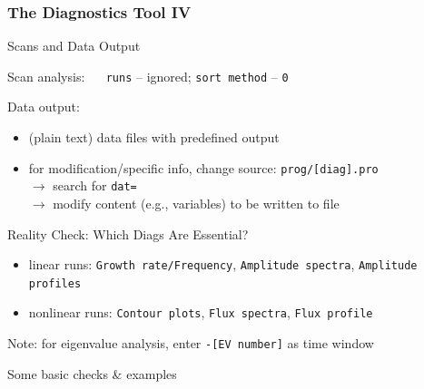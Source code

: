 \documentclass[10pt]{beamer}
\begin{document}

\begin{frame}[fragile]
  \frametitle{The Diagnostics Tool IV}

\begin{block}{Scans and Data Output}

Scan analysis: $\quad$ \verb|runs| -- ignored; \verb|sort method| -- \verb|0|

Data output:
\begin{itemize}
\item (plain text) data files with predefined output
\item for modification/specific info, change source: \verb|prog/[diag].pro|\\
$\rightarrow$ search for \verb|dat=|\\
$\rightarrow$ modify content (e.g., variables) to be written to file
\end{itemize}
\end{block}

\begin{block}{Reality Check: Which Diags Are Essential?}
\begin{itemize}
\item linear runs: \verb|Growth rate/Frequency|, \verb|Amplitude spectra|, \verb|Amplitude profiles|
\item nonlinear runs: \verb|Contour plots|, \verb|Flux spectra|, \verb|Flux profile|
\end{itemize}
\end{block}

Note: for eigenvalue analysis, enter \verb|-[EV number]| as time window

\end{frame}


\begin{frame}[plain]

\begin{center}

\begin{exampleblock}

\begin{center}
\LARGE
Some basic checks \& examples%
\end{center}
\end{exampleblock}

\end{center}
\end{frame}
\end{document}
